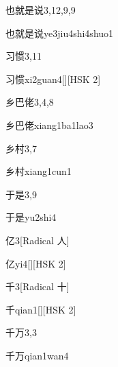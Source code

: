 \begin{entry}{也就是说}{3,12,9,9}
  \begin{phonetics}{也就是说}{ye3jiu4shi4shuo1}
  \end{phonetics}
\end{entry}

\begin{entry}{习惯}{3,11}
  \begin{phonetics}{习惯}{xi2guan4}[][HSK 2]
  \end{phonetics}
\end{entry}

\begin{entry}{乡巴佬}{3,4,8}
  \begin{phonetics}{乡巴佬}{xiang1ba1lao3}
  \end{phonetics}
\end{entry}

\begin{entry}{乡村}{3,7}
  \begin{phonetics}{乡村}{xiang1cun1}
  \end{phonetics}
\end{entry}

\begin{entry}{于是}{3,9}
  \begin{phonetics}{于是}{yu2shi4}
  \end{phonetics}
\end{entry}

\begin{entry}{亿}{3}[Radical 人]
  \begin{phonetics}{亿}{yi4}[][HSK 2]
  \end{phonetics}
\end{entry}

\begin{entry}{千}{3}[Radical 十]
  \begin{phonetics}{千}{qian1}[][HSK 2]
  \end{phonetics}
\end{entry}

\begin{entry}{千万}{3,3}
  \begin{phonetics}{千万}{qian1wan4}
  \end{phonetics}
\end{entry}


